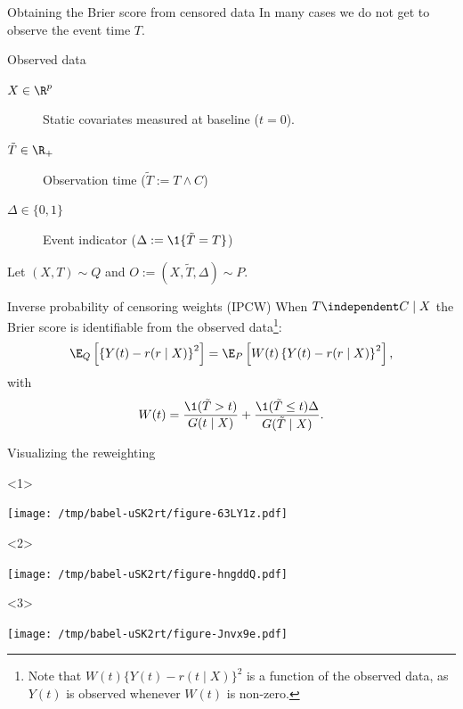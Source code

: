 \documentclass[smaller]{beamer}\usepackage{listings}
\begin{document}
\begin{frame}[label={sec:orga9952fd}]{Obtaining the Brier score from censored data}
In many cases we do not get to observe the event time \(T\). \pause

\begin{block}{Observed data}
\begin{description}
\item[{\(X \in \R^p\)}] Static covariates measured at baseline (\(t=0\)).
\item[{\(\tilde T \in \R_+\)}] Observation time (\(\tilde T := T \wedge C\))
\item[{\(\Delta \in \{0,1\}\)}] Event indicator (\(\Delta := \1\{\tilde T = T\}\))
\end{description}

Let \((X, T) \sim Q\) and \(O := (X, \tilde T, \Delta) \sim P\). \pause
\end{block}

\begin{block}{Inverse probability of censoring weights (IPCW)}
When $T \independent C \mid X$ the Brier score is identifiable from the observed
data\footnote<3->{Note that $W(t)\{Y(t)-r(t\mid X)\}^2$ is a function of the observed data, as
  $Y(t)$ is observed whenever $W(t)$ is non-zero.}:
\begin{equation*}
  \E_Q\left[ 
    \left\{
      Y(t) - r(r \mid X)
    \right\}^2 \right]
  = \E_P\left[
    W(t)
    \left\{
      Y(t) - r(r \mid X)
    \right\}^2 \right],
\end{equation*}
with
\begin{equation*}
  W(t) = \frac{\1({\tilde{T} >t})}{G(t \mid X)} + \frac{\1({\tilde{T}\leq
      t})\Delta}{G(\tilde{T}\mid X)}.
\end{equation*}
\end{block}
\end{frame}


\begin{frame}[label={sec:org607128d}]{Visualizing the reweighting}
\begin{onlyenv}<1>
\begin{center}
\texttt{[image: /tmp/babel-uSK2rt/figure-63LY1z.pdf]}
\end{center}
\end{onlyenv}


\begin{onlyenv}<2>
\begin{center}
\texttt{[image: /tmp/babel-uSK2rt/figure-hngddQ.pdf]}
\end{center}
\end{onlyenv}


\begin{onlyenv}<3>
\begin{center}
\texttt{[image: /tmp/babel-uSK2rt/figure-Jnvx9e.pdf]}
\end{center}
\end{onlyenv}
\end{frame}
\end{document}
